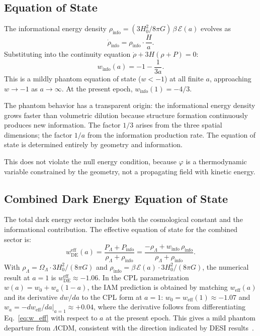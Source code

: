 \documentclass[11pt]{article}
\begin{document}
\subsection{Equation of State}

The informational energy density
$\rho_\mathrm{info} = (3H_0^2/8\pi G)\,\beta\,\mathcal{E}(a)$ evolves as
\begin{equation}
\dot{\rho}_\mathrm{info} = \rho_\mathrm{info}\cdot\frac{H}{a}.
\end{equation}
Substituting into the continuity equation
$\dot{\rho} + 3H(\rho + P) = 0$:
\begin{equation}
w_\mathrm{info}(a) = -1 - \frac{1}{3a}.
\label{eq:w_info}
\end{equation}
This is a mildly phantom equation of state ($w < -1$) at all finite $a$,
approaching $w \to -1$ as $a \to \infty$.  At the present epoch,
$w_\mathrm{info}(1) = -4/3$.

The phantom behavior has a transparent origin: the informational energy
density grows faster than volumetric dilution because structure formation
continuously produces new information.  The factor $1/3$ arises from the
three spatial dimensions; the factor $1/a$ from the information production
rate.  The equation of state is determined entirely by geometry and
information.

This does not violate the null energy condition, because $\varphi$ is a
thermodynamic variable constrained by the geometry, not a propagating field
with kinetic energy.

\subsection{Combined Dark Energy Equation of State}

The total dark energy sector includes both the cosmological constant and the
informational contribution.  The effective equation of state for the combined
sector is:
\begin{equation}
w_\mathrm{DE}^\mathrm{eff}(a) = \frac{P_\Lambda + P_\mathrm{info}}
  {\rho_\Lambda + \rho_\mathrm{info}}
= \frac{-\rho_\Lambda + w_\mathrm{info}\,\rho_\mathrm{info}}
  {\rho_\Lambda + \rho_\mathrm{info}}.
\label{eq:w_eff}
\end{equation}
With $\rho_\Lambda = \Omega_\Lambda \cdot 3H_0^2/(8\pi G)$ and
$\rho_\mathrm{info} = \beta\,\mathcal{E}(a)\cdot 3H_0^2/(8\pi G)$, the
numerical result at $a = 1$ is $w_\mathrm{DE}^\mathrm{eff} \approx -1.06$.
In the CPL parametrization $w(a) = w_0 + w_a(1-a)$, the IAM prediction is
obtained by matching $w_\mathrm{eff}(a)$ and its derivative $dw/da$ to the
CPL form at $a = 1$: $w_0 = w_\mathrm{eff}(1) \approx -1.07$ and
$w_a = -dw_\mathrm{eff}/da|_{a=1} \approx +0.04$, where the derivative
follows from differentiating Eq.~\eqref{eq:w_eff} with respect to $a$
at the present epoch.  This gives a mild phantom departure from $\Lambda$CDM,
consistent with the direction indicated by DESI
results~\citep{DESIDR1}.
\end{document}
